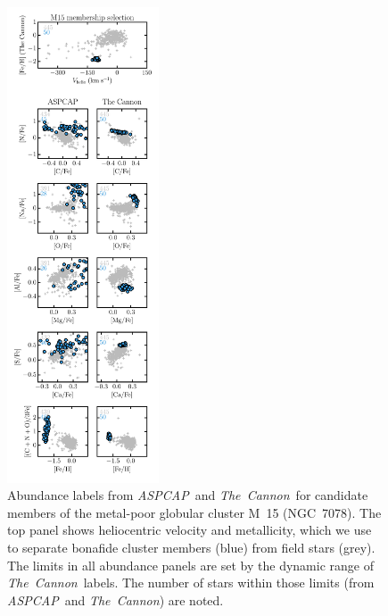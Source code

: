 \documentclass[12pt,preprint]{aastex}
\newcommand{\project}[1]{\textsl{#1}}
\newcommand{\TheCannon}{\project{The~Cannon}}
\newcommand{\acronym}[1]{{\small{#1}}}
\newcommand{\aspcap}{\project{\acronym{ASPCAP}}}
\begin{document}
\begin{figure}[p]
\includegraphics[width=0.40\textwidth]{M15_comparison.pdf}
\caption{Abundance labels from \aspcap\ and \TheCannon\ for candidate
members of the metal-poor globular cluster M~15 (NGC~7078).  The top panel
shows heliocentric velocity and metallicity, which we use to separate
bonafide cluster members (blue) from field stars (grey). The limits
in all abundance panels are set by the dynamic range of \TheCannon\ labels.
The number of stars within those limits (from \aspcap\ and \TheCannon)
are noted.\label{fig:m15-comparison}}
\end{figure}

\clearpage
\end{document}
